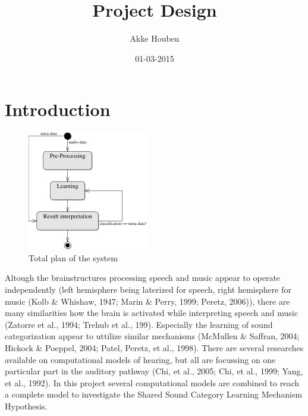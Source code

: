 \documentclass{article}
\title{Project Design}
\author{Akke Houben}
\date{01-03-2015}
\begin{document}
\maketitle
\section{Introduction}
\begin{figure}
	\includegraphics{img/plan_tot.jpg}
	\caption{Total plan of the system}
	\label{fig:total}
\end{figure}
Altough the brainstructures processing speech and music appear to operate independently (left hemisphere being laterized for speech, right hemisphere for music (Kolb \& Whishaw, 1947; Marin \& Perry, 1999; Peretz, 2006)), there are many similarities how the brain is activated while interpreting speech and music (Zatorre et al., 1994; Trehub et al., 199). Especially the learning of sound categorization appear to uttilize similar mechanisms (McMullen \& Saffran, 2004; Hickock \& Poeppel, 2004; Patel, Peretz, et al., 1998). There are several researches available on computational models of hearing, but all are focussing on one particular part in the auditory pathway (Chi, et al., 2005; Chi, et al., 1999; Yang, et al., 1992).  In this project several computational models are combined to reach a complete model to investigate the Shared Sound Category Learning Mechanism Hypothesis.
\end{document}
